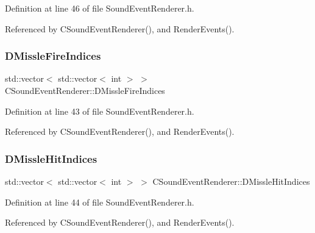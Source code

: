 Definition at line 46 of file Sound\+Event\+Renderer.\+h.



Referenced by C\+Sound\+Event\+Renderer(), and Render\+Events().

\hypertarget{classCSoundEventRenderer_ab781b03b940441c7d23fe1d6031d773e}{}\label{classCSoundEventRenderer_ab781b03b940441c7d23fe1d6031d773e} 
\subsubsection{\texorpdfstring{D\+Missle\+Fire\+Indices}{DMissleFireIndices}}
{\footnotesize\ttfamily std\+::vector$<$ std\+::vector$<$ int $>$ $>$ C\+Sound\+Event\+Renderer\+::\+D\+Missle\+Fire\+Indices\hspace{0.3cm}{\ttfamily [protected]}}



Definition at line 43 of file Sound\+Event\+Renderer.\+h.



Referenced by C\+Sound\+Event\+Renderer(), and Render\+Events().

\hypertarget{classCSoundEventRenderer_aa551953be1c1e7926432996c78c6d8d8}{}\label{classCSoundEventRenderer_aa551953be1c1e7926432996c78c6d8d8} 
\subsubsection{\texorpdfstring{D\+Missle\+Hit\+Indices}{DMissleHitIndices}}
{\footnotesize\ttfamily std\+::vector$<$ std\+::vector$<$ int $>$ $>$ C\+Sound\+Event\+Renderer\+::\+D\+Missle\+Hit\+Indices\hspace{0.3cm}{\ttfamily [protected]}}



Definition at line 44 of file Sound\+Event\+Renderer.\+h.



Referenced by C\+Sound\+Event\+Renderer(), and Render\+Events().

\hypertarget{classCSoundEventRenderer_a0ca919430ff2fb57324c0ee712c5b7b1}{}\label{classCSoundEventRenderer_a0ca919430ff2fb57324c0ee712c5b7b1} 
